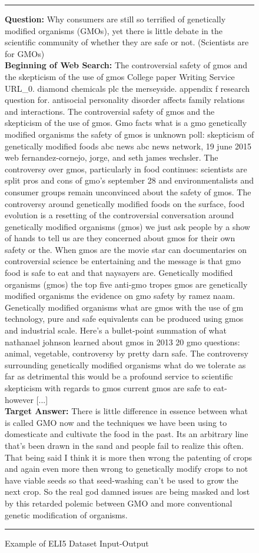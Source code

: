 \documentclass[11pt,a4paper]{article}
\begin{document}
\begin{figure*}[t]
  \small
  \rule{\linewidth}{1pt}
    \noindent \textbf{Question:} Why consumers are still so terrified of genetically modified organisms (GMOs), yet there is little debate in the scientific community of whether they are safe or not. (Scientists are for GMOs)\\  

    \noindent \textbf{Beginning of Web Search: } The controversial safety of gmos and the skepticism of the use of gmos College paper Writing Service URL\_0. diamond chemicals plc the merseyside. appendix f research question for. antisocial personality disorder affects family relations and interactions. The controversial safety of gmos and the skepticism of the use of gmos. Gmo facts what is a gmo genetically modified organisms the safety of gmos is unknown poll: skepticism of genetically modified foods abc news abc news network, 19 june 2015 web fernandez-cornejo, jorge, and seth james wechsler. The controversy over gmos, particularly in food continues: scientists are split pros and cons of gmo's september 28 and environmentalists and consumer groups remain unconvinced about the safety of gmos. The controversy around genetically modified foods on the surface, food evolution is a resetting of the controversial conversation around genetically modified organisms (gmos) we just ask people by a show of hands to tell us are they concerned about gmos for their own safety or the. When gmos are the movie star can documentaries on controversial science be entertaining and the message is that gmo food is safe to eat and that naysayers are. Genetically modified organisms (gmos) the top five anti-gmo tropes gmos are genetically modified organisms the evidence on gmo safety by ramez naam. Genetically modified organisms what are gmos with the use of gm technology, pure and safe equivalents can be produced using gmos and industrial scale. Here's a bullet-point summation of what nathanael johnson learned about gmos in 2013 20 gmo questions: animal, vegetable, controversy by pretty darn safe. The controversy surrounding genetically modified organisms what do we tolerate as far as detrimental this would be a profound service to scientific skepticism with regards to gmos current gmos are safe to eat- however [...]\\  
    
    \textbf{Target Answer:} There is little difference in essence between what is called GMO now and the techniques we have been using to domesticate and cultivate the food in the past. Its an arbitrary line that's been drawn in the sand and people fail to realize this often. That being said I think it is more then wrong the patenting of crops and again even more then wrong to genetically modify crops to not have viable seeds so that seed-washing can't be used to grow the next crop. So the real god damned issues are being masked and lost by this retarded polemic between GMO and more conventional genetic modification of organisms. \\

  \rule{\linewidth}{1pt}
  \caption{Example of ELI5 Dataset Input-Output}
  \label{fig:example_eli5}
\end{figure*} 
\end{document}
